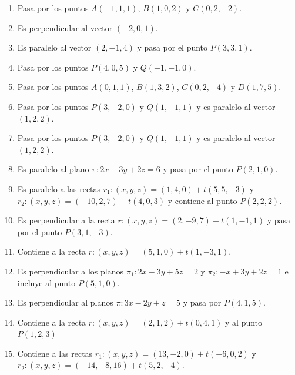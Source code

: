 \documentclass[a4paper]{article}
\begin{document}
\begin{enumerate}
\begin{enumerate} [label=(\alph*)]
		\item  Pasa por los puntos $A(-1,1,1)$, $B(1,0,2)$ y $C(0,2,-2)$.

		\item  Es perpendicular al vector $(-2,0,1)$.

		\item  Es paralelo al vector $(2,-1,4)$ y pasa por el punto $P(3,3,1)$.

		\item  Pasa por los puntos $P(4,0,5)$ y $Q(-1,-1,0)$.

		\item  Pasa por los puntos $A(0,1,1)$, $B(1,3,2)$, $C(0,2,-4)$ y $D(1,7,5)$.

		\item  Pasa por los puntos $P(3,-2,0)$ y $Q(1,-1,1)$ y es paralelo al vector $(1,2,2)$.

		\item  Pasa por los puntos $P(3,-2,0)$ y $Q(1,-1,1)$ y es paralelo al vector $(1,2,2)$.

		\item  Es paralelo al plano $\pi: 2x-3y+2z=6$ y pasa por el punto $P(2,1,0)$.

		\item  Es paralelo a las rectas $r_1: (x,y,z)=(1,4,0)+t(5,5,-3)$ y $r_2: (x,y,z)=(-10,2,7)+t(4,0,3)$ y contiene al punto $P(2,2,2)$.

		\item  Es perpendicular a la recta $r: (x,y,z)=(2,-9,7)+t(1,-1,1)$ y pasa por el punto $P(3,1,-3)$.

		\item  Contiene a la recta $r: (x,y,z)=(5,1,0)+t(1,-3,1)$.

		\item Es perpendicular a los planos $\pi_1: 2x-3y+5z=2$ y $\pi_2: -x+3y+2z=1$ e incluye al punto $P(5,1,0)$.

		\item Es perpendicular al planos $\pi: 3x-2y+z=5$ y pasa por $P(4,1,5)$.

		\item  Contiene a la recta $r: (x,y,z)=(2,1,2)+t(0,4,1)$ y al punto $P(1,2,3)$

		\item  Contiene a las rectas $r_1: (x,y,z)=(13,-2,0)+t(-6,0,2)$ y $r_2: (x,y,z)=(-14,-8,16)+t(5,2,-4)$.

	\end{enumerate}


\end{enumerate}
\end{document}
